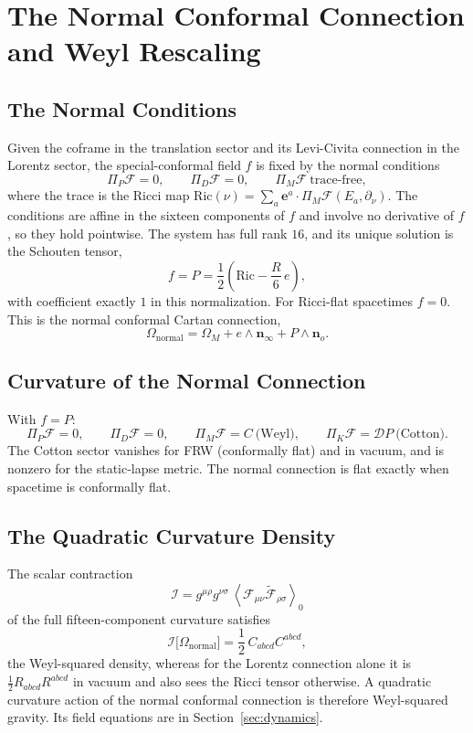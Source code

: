 \documentclass[11pt,a4paper]{article}
\newcommand{\D}{\mathcal{D}}
\newcommand{\F}{\mathcal{F}}
\newcommand{\Om}{\Omega}
\newcommand{\Ric}{\mathrm{Ric}}
\newcommand{\nzero}{\mathbf{n}_o}
\newcommand{\ninf}{\mathbf{n}_\infty}
\newcommand{\e}{\mathbf{e}}
\newcommand{\wedgeprod}{\mathbin{\wedge}}
\newcommand{\rev}[1]{\widetilde{#1}}
\newcommand{\grade}[2]{\left\langle #1\right\rangle_{#2}}
\begin{document}
\section{The Normal Conformal Connection and Weyl Rescaling}
\label{sec:normal}

\subsection{The Normal Conditions}

Given the coframe in the translation sector and its Levi-Civita
connection in the Lorentz sector, the special-conformal field \(f\) is
fixed by the normal conditions
\[
    \Pi_P\F=0,\qquad
    \Pi_D\F=0,\qquad
    \Pi_M\F\ \text{trace-free},
\]
where the trace is the Ricci map
\(\Ric(\nu)=\sum_a\e^a\cdot\Pi_M\F(E_a,\partial_\nu)\). The conditions
are affine in the sixteen components of \(f\) and involve no
derivative of \(f\), so they hold pointwise. The system has full
rank \(16\), and its unique solution is the Schouten tensor,
\[
    \boxed{
        f=P=\frac12\left(\Ric-\frac{R}{6}\,e\right),
    }
\]
with coefficient exactly \(1\) in this normalization. For Ricci-flat
spacetimes \(f=0\). This is the normal conformal Cartan
connection,
\[
    \Om_{\mathrm{normal}}=\Om_M+e\wedgeprod\ninf+P\wedgeprod\nzero .
\]

\subsection{Curvature of the Normal Connection}

With \(f=P\):
\[
    \Pi_P\F=0,\qquad
    \Pi_D\F=0,\qquad
    \Pi_M\F=C\ \text{(Weyl)},\qquad
    \Pi_K\F=\D P\ \text{(Cotton)}.
\]
The Cotton sector vanishes for FRW (conformally flat) and in vacuum,
and is nonzero for the static-lapse metric. The normal connection is
flat exactly when spacetime is conformally flat.

\subsection{The Quadratic Curvature Density}

The scalar contraction
\[
    \mathcal{I}=g^{\mu\rho}g^{\nu\sigma}\,
    \grade{\F_{\mu\nu}\rev{\F}_{\rho\sigma}}{0}
\]
of the full fifteen-component curvature satisfies
\[
    \boxed{
        \mathcal{I}\bigl[\Om_{\mathrm{normal}}\bigr]
        =\frac12\,C_{abcd}C^{abcd},
    }
\]
the Weyl-squared density, whereas for the Lorentz connection alone it
is \(\tfrac12R_{abcd}R^{abcd}\) in vacuum and also sees the Ricci
tensor otherwise. A quadratic curvature action of the normal
conformal connection is therefore Weyl-squared gravity. Its field equations are in
Section~\ref{sec:dynamics}.
\end{document}
